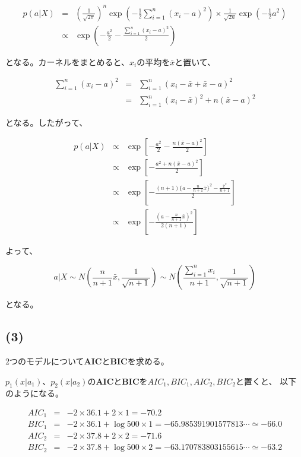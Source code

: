 \documentclass[a4j,xelatex,ja=standard,jafont=hiragino-pron, 9pt]{bxjsarticle}
\begin{document}
\begin{eqnarray}
  p(a|X)
  &=& \left(\frac{1}{\sqrt{2\pi}}\right)^n
    \exp \left(-\frac{1}{2} \sum_{i=1}^n (x_i - a)^2\right)
    \times \frac{1}{\sqrt{2n}} \exp \left(- \frac{1}{2} a^2\right) \nonumber \\
  &\propto& \exp \left(- \frac{a^2}{2} - \frac{\sum_{i=1}^n (x_i - a)^2}{2}\right)
\end{eqnarray}

となる。カーネルをまとめると、$x_i$の平均を$\bar{x}$と置いて、

\begin{eqnarray}
  \sum_{i=1}^n(x_i - a)^2
  &=& \sum_{i=1}^n (x_i - \bar{x} + \bar{x} - a)^2 \nonumber \\
  &=& \sum_{i=1}^n (x_i - \bar{x})^2 + n(\bar{x} - a)^2
\end{eqnarray}

となる。したがって、

\begin{eqnarray}
  p(a|X)
  &\propto& \exp \left[- \frac{a^2}{2} - \frac{n(\bar{x} - a)^2}{2}\right] \nonumber \\
  &\propto& \exp \left[- \frac{a^2 + n(\bar{x} - a)^2}{2} \right] \nonumber \\
  &\propto& \exp
    \left[- \frac{
      (n + 1) \{ a - \frac{n}{n+1}\bar{x} \}^2 - \frac{\bar{x}^2}{n+1}
    }{2}
    \right] \nonumber \\
  &\propto& \exp \left[ - \frac{(a - \frac{n}{n+1}\bar{x})^2}{2(n+1)}\right]
\end{eqnarray}

よって、

\begin{equation}
  a|X \sim N\left(\frac{n}{n+1}\bar{x}, \frac{1}{\sqrt{n+1}}\right) \sim N\left(\frac{\sum_{i=1}^n x_i}{n+1}, \frac{1}{\sqrt{n+1}}\right)
\end{equation}

となる。

\subsection*{(3)}

2つのモデルについて\textbf{AIC}と\textbf{BIC}を求める。

$p_1(x|a_1)$、$p_2(x|a_2)$の\textbf{AIC}と\textbf{BIC}を$AIC_1, BIC_1, AIC_2, BIC_2$と置くと、
以下のようになる。

\begin{eqnarray}
  AIC_1 &=& -2 \times 36.1 + 2 \times 1 = -70.2 \\
  BIC_1 &=& -2 \times 36.1 + \log 500 \times 1 = -65.985391901577813 \cdots \simeq -66.0 \\
  AIC_2 &=& -2 \times 37.8 + 2 \times 2 = -71.6 \\
  BIC_2 &=& -2 \times 37.8 + \log 500 \times 2 = -63.170783803155615 \cdots \simeq -63.2
\end{eqnarray}
\end{document}
